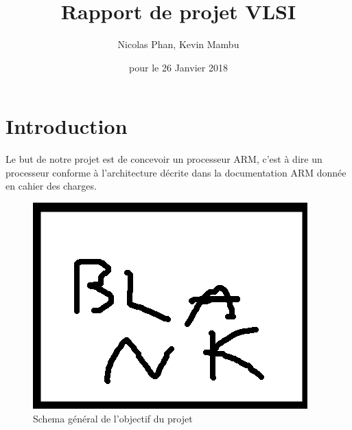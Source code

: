 \documentclass{article}
\begin{document}
\title{Rapport de projet VLSI}
\author{Nicolas Phan, Kevin Mambu}
\date{pour le 26 Janvier 2018}
\pagestyle{headings}
\maketitle


\section{Introduction}

Le but de notre projet est de concevoir un processeur ARM, c'est à dire un processeur conforme
à l'architecture décrite dans la documentation ARM donnée en cahier des charges.

\begin{figure}[h]
\includegraphics[scale=1]{pics/blank.png}
\centering
\caption{Schema général de l'objectif du projet}
\end{figure}

\end{document}
